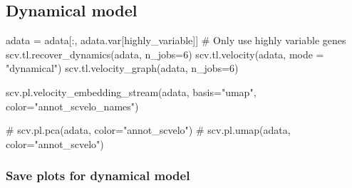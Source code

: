 \documentclass[
  letterpaper,
  DIV=11,
  numbers=noendperiod]{scrreprt}
\newenvironment{Shaded}{\begin{snugshade}}{\end{snugshade}}
\newcommand{\CommentTok}[1]{\textcolor[rgb]{0.37,0.37,0.37}{#1}}
\newcommand{\DecValTok}[1]{\textcolor[rgb]{0.68,0.00,0.00}{#1}}
\newcommand{\NormalTok}[1]{\textcolor[rgb]{0.00,0.23,0.31}{#1}}
\newcommand{\OperatorTok}[1]{\textcolor[rgb]{0.37,0.37,0.37}{#1}}
\newcommand{\StringTok}[1]{\textcolor[rgb]{0.13,0.47,0.30}{#1}}
\begin{document}
\subsection{Dynamical model}\label{dynamical-model}

\begin{Shaded}
\begin{Highlighting}[]
\NormalTok{adata }\OperatorTok{=}\NormalTok{ adata[:, adata.var[}\StringTok{\textquotesingle{}highly\_variable\textquotesingle{}}\NormalTok{]]  }\CommentTok{\# Only use highly variable genes}
\NormalTok{scv.tl.recover\_dynamics(adata, n\_jobs}\OperatorTok{=}\DecValTok{6}\NormalTok{)}
\NormalTok{scv.tl.velocity(adata, mode }\OperatorTok{=} \StringTok{"dynamical"}\NormalTok{)}
\NormalTok{scv.tl.velocity\_graph(adata, n\_jobs}\OperatorTok{=}\DecValTok{6}\NormalTok{)}

\NormalTok{scv.pl.velocity\_embedding\_stream(adata, basis}\OperatorTok{=}\StringTok{"umap"}\NormalTok{, color}\OperatorTok{=}\StringTok{"annot\_scvelo\_names"}\NormalTok{)}

\CommentTok{\# scv.pl.pca(adata, color="annot\_scvelo")}
\CommentTok{\# scv.pl.umap(adata, color="annot\_scvelo")}
\end{Highlighting}
\end{Shaded}

\subsubsection{Save plots for dynamical
model}\label{save-plots-for-dynamical-model}
\end{document}

